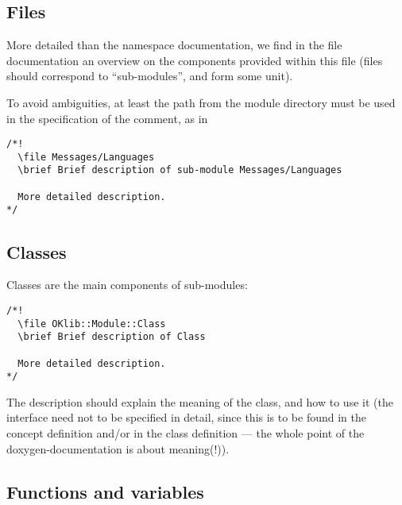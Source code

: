 \documentclass{book}
\begin{document}
\subsection{Files}
\label{sec:FilesDox}

More detailed than the namespace documentation, we find in the file documentation an overview on the components provided within this file (files should correspond to ``sub-modules'', and form some unit).

To avoid ambiguities, at least the path from the module directory must be used in the specification of the comment, as in
\begin{verbatim}
/*!
  \file Messages/Languages
  \brief Brief description of sub-module Messages/Languages

  More detailed description.
*/
\end{verbatim}


\subsection{Classes}
\label{sec:ClassDox}

Classes are the main components of sub-modules:
\begin{verbatim}
/*!
  \file OKlib::Module::Class
  \brief Brief description of Class

  More detailed description.
*/
\end{verbatim}
The description should explain the meaning of the class, and how to use it (the interface need not to be specified in detail, since this is to be found in the concept definition and/or in the class definition --- the whole point of the doxygen-documentation is about meaning(!)).


\subsection{Functions and variables}
\label{sec:GlobalFuncDox}
\end{document}
